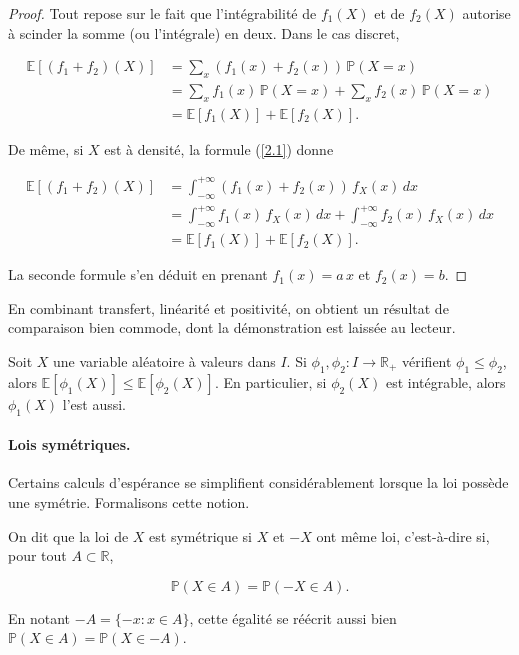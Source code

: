 \begin{proof}
Tout repose sur le fait que l'intégrabilité de $f_1(X)$ et de $f_2(X)$ autorise à scinder la somme (ou l'intégrale) en deux. Dans le cas discret,

\begin{align*}
\mathbb{E}[(f_1 + f_2)(X)] &= \sum_x (f_1(x) + f_2(x))\, \mathbb{P}(X = x) \\
&= \sum_x f_1(x)\, \mathbb{P}(X = x) + \sum_x f_2(x)\, \mathbb{P}(X = x) \\
&= \mathbb{E}[f_1(X)] + \mathbb{E}[f_2(X)].
\end{align*}

De même, si $X$ est à densité, la formule (\ref{2.1}) donne

\begin{align*}
\mathbb{E}[(f_1 + f_2)(X)] &= \int_{-\infty}^{+\infty} (f_1(x) + f_2(x))\, f_X(x)\, dx \\
&= \int_{-\infty}^{+\infty} f_1(x)\, f_X(x)\, dx + \int_{-\infty}^{+\infty} f_2(x)\, f_X(x)\, dx \\
&= \mathbb{E}[f_1(X)] + \mathbb{E}[f_2(X)].
\end{align*}

La seconde formule s'en déduit en prenant $f_1(x) = a\,x$ et $f_2(x) = b$.
\end{proof}

En combinant transfert, linéarité et positivité, on obtient un résultat de comparaison bien commode, dont la démonstration est laissée au lecteur.

\medskip

\begin{mdframed}
\begin{lemme}
Soit $X$ une variable aléatoire à valeurs dans $I$. Si $\phi_1, \phi_2 : I \to \mathbb{R}_+$ vérifient $\phi_1 \leq \phi_2$, alors $\mathbb{E}[\phi_1(X)] \leq \mathbb{E}[\phi_2(X)]$. En particulier, si $\phi_2(X)$ est intégrable, alors $\phi_1(X)$ l'est aussi.
\end{lemme}
\end{mdframed}

\paragraph{Lois symétriques.} Certains calculs d'espérance se simplifient considérablement lorsque la loi possède une symétrie. Formalisons cette notion.

\medskip

\begin{mdframed}
\begin{definition}
On dit que la loi de $X$ est symétrique si $X$ et $-X$ ont même loi, c'est-à-dire si, pour tout $A \subset \mathbb{R}$,

$$
\mathbb{P}(X \in A) = \mathbb{P}(-X \in A).
$$

En notant $-A = \{-x : x \in A\}$, cette égalité se réécrit aussi bien $\mathbb{P}(X \in A) = \mathbb{P}(X \in -A)$.
\end{definition}
\end{mdframed}

